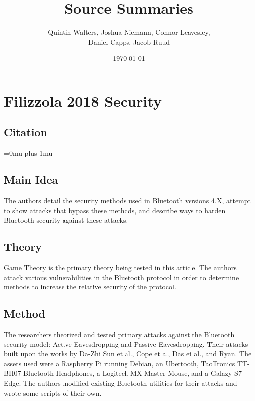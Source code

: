 \documentclass[letterpaper,12pt]{article}
\begin{document}
	\nobibliography*
	
    \title{Source Summaries}
    \author{Quintin Walters, Joshua Niemann, Connor Leavesley,\\
    Daniel Capps, Jacob Ruud}
    \date{\today}
    \maketitle
\break
\tableofcontents
\break

\noindent
\section{Filizzola 2018 Security}
\subsection{Citation}

\noindent

\Urlmuskip=0mu plus 1mu\relax
{}

\subsection{Main Idea}

\noindent
The authors detail the security methods used in Bluetooth versions 4.X, attempt to show attacks that bypass these methods, and describe ways to harden Bluetooth security against these attacks.  

\subsection{Theory}

\noindent
Game Theory is the primary theory being tested in this article.  The authors attack various vulnerabilities in the Bluetooth protocol in order to determine methods to increase the relative security of the protocol.

\subsection{Method}

\noindent
The researchers theorized and tested primary attacks against the Bluetooth security model: Active Eavesdropping and Passive Eavesdropping.  Their attacks built upon the works by Da-Zhi Sun et al., Cope et a., Das et al., and Ryan.  The assets used were a Raspberry Pi running Debian, an Ubertooth, TaoTronics TT-BH07 Bluetooth Headphones, a Logitech MX Master Mouse, and a Galazy S7 Edge.  The authors modified existing Bluetooth utilities for their attacks and wrote some scripts of their own.
\end{document}
